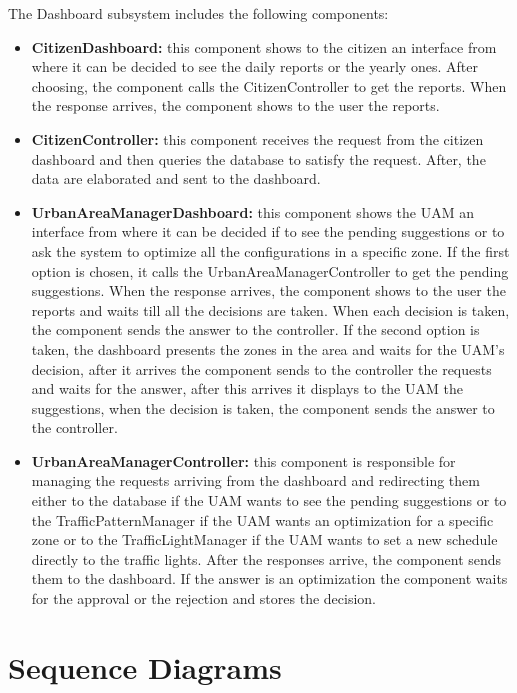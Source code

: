 \documentclass[12pt, a4paper, twoside, openright]{report}
\begin{document}
The Dashboard subsystem includes the following components:

\begin{itemize}
\item
  \textbf{CitizenDashboard:} this component shows to the citizen an
  interface from where it can be decided to see the daily reports or the
  yearly ones. After choosing, the component calls the CitizenController
  to get the reports. When the response arrives, the component shows to
  the user the reports.
\item
  \textbf{CitizenController:} this component receives the request from
  the citizen dashboard and then queries the database to satisfy the
  request. After, the data are elaborated and sent to the dashboard.
\item
  \textbf{UrbanAreaManagerDashboard:} this component shows the UAM an
  interface from where it can be decided if to see the pending
  suggestions or to ask the system to optimize all the configurations in
  a specific zone. If the first option is chosen, it calls the
  UrbanAreaManagerController to get the pending suggestions. When the
  response arrives, the component shows to the user the reports and
  waits till all the decisions are taken. When each decision is taken,
  the component sends the answer to the controller. If the second option
  is taken, the dashboard presents the zones in the area and waits for
  the UAM's decision, after it arrives the component sends to the
  controller the requests and waits for the answer, after this arrives
  it displays to the UAM the suggestions, when the decision is taken,
  the component sends the answer to the controller.
\item
  \textbf{UrbanAreaManagerController:} this component is responsible for
  managing the requests arriving from the dashboard and redirecting them
  either to the database if the UAM wants to see the pending suggestions
  or to the TrafficPatternManager if the UAM wants an optimization for a
  specific zone or to the TrafficLightManager if the UAM wants to
  set a new schedule directly to the traffic lights. After the responses arrive, the component sends them to
  the dashboard. If the answer is an optimization the component waits
  for the approval or the rejection and stores the decision.
\end{itemize}
  
\section{Sequence Diagrams}
\end{document}
